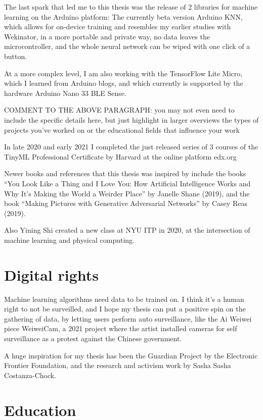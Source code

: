The last spark that led me to this thesis was the release of 2 libraries for machine learning on the Arduino platform: The currently beta version Arduino KNN, which allows for on-device training and resembles my earlier studies with Wekinator, in a more portable and private way, no data leaves the microcontroller, and the whole neural network can be wiped with one click of a button.

At a more complex level, I am also working with the TensorFlow Lite Micro, which I learned from Arduino blogs, and which currently is supported by the hardware Arduino Nano 33 BLE Sense.

COMMENT TO THE ABOVE PARAGRAPH: you may not even need to include the specific details here, but just highlight in larger overviews the types of projects you've worked on or the educational fields that influence your work

In late 2020 and early 2021 I completed the just released series of 3 courses of the TinyML Professional Certificate by Harvard at the online platform edx.org

Newer books and references that this thesis was inspired by include the books “You Look Like a Thing and I Love You: How Artificial Intelligence Works and Why It's Making the World a Weirder Place” by Janelle Shane (2019), and the book “Making Pictures with Generative Adversarial Networks” by Casey Reas (2019).

Also Yining Shi created a new class at NYU ITP in 2020, at the intersection of machine learning and physical computing.

\section{Digital rights}

Machine learning algorithms need data to be trained on. I think it’s a human right to not be surveilled, and I hope my thesis can put a positive spin on the gathering of data, by letting users perform auto surveillance, like the Ai Weiwei piece WeiweiCam, a 2021 project where the artist installed cameras for self surveillance as a protest against the Chinese government.

A huge inspiration for my thesis has been the Guardian Project by the Electronic Frontier Foundation, and the research and activism work by Sasha Sasha Costanza-Chock.

\section{Education}


